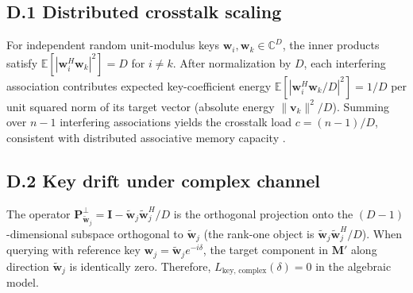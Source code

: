 \documentclass[11pt,a4paper]{article}
\newcommand{\M}{\mathbf{M}}
\newcommand{\C}{\mathbb{C}}
\begin{document}
\subsection{D.1 Distributed crosstalk scaling}
For independent random unit-modulus keys $\mathbf{w}_i, \mathbf{w}_k \in \C^D$, the inner products satisfy $\mathbb{E}[|\mathbf{w}_i^H \mathbf{w}_k|^2] = D$ for $i \ne k$. After normalization by $D$, each interfering association contributes expected key-coefficient energy $\mathbb{E}[|\mathbf{w}_i^H \mathbf{w}_k / D|^2] = 1/D$ per unit squared norm of its target vector (absolute energy $\|\mathbf{v}_k\|^2/D$). Summing over $n-1$ interfering associations yields the crosstalk load $c=(n-1)/D$, consistent with distributed associative memory capacity \citep{plate1995holographic,kanerva2009hyperdimensional,frady2018theory}.

\subsection{D.2 Key drift under complex channel}
The operator $\mathbf{P}_{\tilde{\mathbf{w}}_j}^\perp = \mathbf{I} - \tilde{\mathbf{w}}_j \tilde{\mathbf{w}}_j^H / D$ is the orthogonal projection onto the $(D-1)$-dimensional subspace orthogonal to $\tilde{\mathbf{w}}_j$ (the rank-one object is $\tilde{\mathbf{w}}_j \tilde{\mathbf{w}}_j^H / D$). When querying with reference key $\mathbf{w}_j = \tilde{\mathbf{w}}_j e^{-i\delta}$, the target component in $\M'$ along direction $\tilde{\mathbf{w}}_j$ is identically zero. Therefore, $L_{\text{key, complex}}(\delta) = 0$ in the algebraic model.
\end{document}
